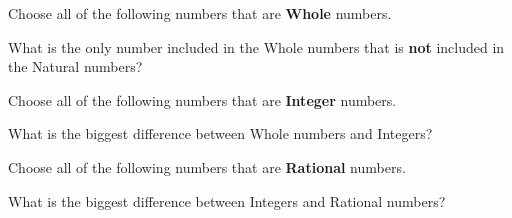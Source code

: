 \documentclass{ximera}
\begin{document}
\begin{exercise}
Choose all of the following numbers that are \textbf{Whole} numbers.
  \begin{selectAll}
  \end{selectAll}

\begin{hint}
	What is the only number included in the Whole numbers that is \textbf{not} included in the Natural numbers?
\end{hint}
\end{exercise}

\begin{exercise}
Choose all of the following numbers that are \textbf{Integer} numbers.
  \begin{selectAll}
  \end{selectAll}

\begin{hint}
	What is the biggest difference between Whole numbers and Integers?
\end{hint}
\end{exercise}

\begin{exercise}
Choose all of the following numbers that are \textbf{Rational} numbers.
  \begin{selectAll}
  \end{selectAll}

\begin{hint}
	What is the biggest difference between Integers and Rational numbers?
\end{hint}
\end{exercise}
\end{document}
